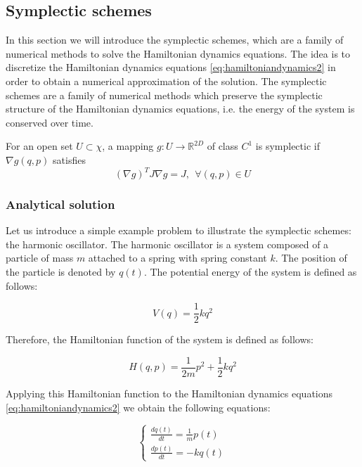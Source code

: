 \documentclass{article}
\begin{document}
\subsection{Symplectic schemes}
\label{sec:symplectic_schemes}

In this section we will introduce the symplectic schemes, which are a family of numerical methods to solve the Hamiltonian dynamics equations. The idea is to discretize the Hamiltonian dynamics equations \eqref{eq:hamiltoniandynamics2} in order to obtain a numerical approximation of the solution. The symplectic schemes are a family of numerical methods which preserve the symplectic structure of the Hamiltonian dynamics equations, i.e. the energy of the system is conserved over time.

\begin{definition}
	For an open set \(U \subset \chi \), a mapping \(g: U \rightarrow \mathbb{R}^{2D}\) of class \(C^1\) is symplectic if \(\nabla g(q,p)\) satisfies
	\[
		(\nabla g)^T J \nabla g = J, \ \ \forall (q,p) \in U
	\]
\end{definition}

\subsubsection{Analytical solution}
\label{sec:analytical_solution}

Let us introduce a simple example problem to illustrate the symplectic schemes: the harmonic oscillator. The harmonic oscillator is a system composed of a particle of mass \(m\) attached to a spring with spring constant \(k\). The position of the particle is denoted by \(q(t)\). The potential energy of the system is defined as follows:

\begin{equation*}
	V(q) = \frac{1}{2} k q^2
\end{equation*}

Therefore, the Hamiltonian function of the system is defined as follows:

\begin{equation}
	H(q,p) = \frac{1}{2m} p^2 + \frac{1}{2} k q^2
	\label{eq:hamiltonianharmonicoscillator}
\end{equation}

Applying this Hamiltonian function to the Hamiltonian dynamics equations \eqref{eq:hamiltoniandynamics2} we obtain the following equations:

\begin{equation*}
	\begin{cases}
		\frac{dq(t)}{dt} = \frac{1}{m} p(t) \\
		\frac{dp(t)}{dt} = -k q(t)
	\end{cases}
\end{equation*}
\end{document}
